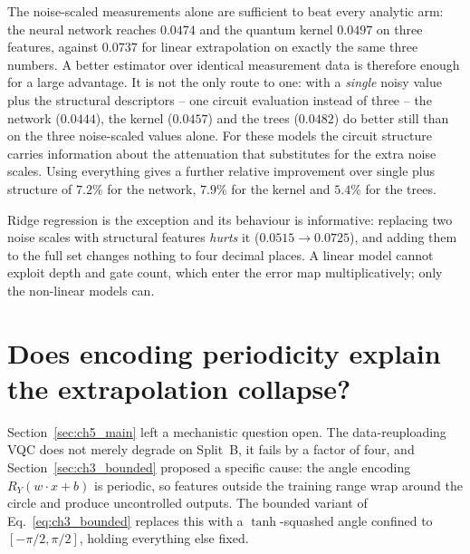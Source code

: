 \documentclass[Thesis.tex]{subfiles}
\begin{document}
The noise-scaled measurements alone are sufficient to beat every analytic arm: the
neural network reaches $0.0474$ and the quantum kernel $0.0497$ on three features,
against $0.0737$ for linear extrapolation on exactly the same three numbers. A
better estimator over identical measurement data is therefore enough for a large
advantage. It is not the only route to one: with a \emph{single} noisy value plus the
structural descriptors -- one circuit evaluation instead of three -- the network
($0.0444$), the kernel ($0.0457$) and the trees ($0.0482$) do better still than on
the three noise-scaled values alone. For these models the circuit structure carries
information about the attenuation that substitutes for the extra noise scales.
Using everything gives a further relative improvement over single plus structure of
$7.2\%$ for the network, $7.9\%$ for the kernel and $5.4\%$ for the trees.

Ridge regression is the exception and its behaviour is informative: replacing two
noise scales with structural features \emph{hurts} it ($0.0515 \rightarrow 0.0725$),
and adding them to the full set changes nothing to four decimal places. A linear
model cannot exploit depth and gate count, which enter the error map
multiplicatively; only the non-linear models can.

\section{Does encoding periodicity explain the extrapolation collapse?}
\label{sec:ch5_bounded}

Section~\ref{sec:ch5_main} left a mechanistic question open. The data-reuploading
VQC does not merely degrade on Split~B, it fails by a factor of four, and
Section~\ref{sec:ch3_bounded} proposed a specific cause: the angle encoding
$R_Y(w \cdot x + b)$ is periodic, so features outside the training range wrap around
the circle and produce uncontrolled outputs. The bounded variant of
Eq.~\eqref{eq:ch3_bounded} replaces this with a $\tanh$-squashed angle confined to
$[-\pi/2, \pi/2]$, holding everything else fixed.
\end{document}
